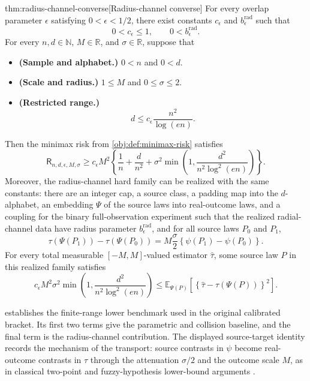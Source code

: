 \documentclass[11pt]{article}
\begin{document}
\begin{theoremv}{thm:radius-channel-converse}[Radius-channel converse]
For every overlap parameter \(\epsilon\) satisfying \(0<\epsilon<1/2\), there exist constants \(c_{\epsilon}\) and \(b_{\epsilon}^{\mathrm{rad}}\) such that
\[
0<c_{\epsilon}\le 1,
\qquad
0<b_{\epsilon}^{\mathrm{rad}}.
\]
For every \(n,d\in\mathbb N\), \(M\in\mathbb R\), and \(\sigma\in\mathbb R\), suppose that
\begin{itemize}
\item \textbf{(Sample and alphabet.)} \(0<n\) and \(0<d\).
\item \textbf{(Scale and radius.)} \(1\le M\) and \(0\le\sigma\le2\).
\item \textbf{(Restricted range.)}
\[
d\le c_{\epsilon}\frac{n^2}{\log(en)}.
\]
\end{itemize}
Then the minimax risk from \cref{obj:def:minimax-risk} satisfies
\[
\mathsf R_{n,d,\epsilon,M,\sigma}
\ge
c_{\epsilon}M^2
\left\{
\frac1n+\frac d{n^2}
+\sigma^2
\min\left(1,\frac{d^2}{n^2\log^2(en)}\right)
\right\}.
\]
Moreover, the radius-channel hard family can be realized with the same constants: there are an integer cap, a source class, a padding map into the \(d\)-alphabet, an embedding \(\Psi\) of the source laws into real-outcome laws, and a coupling for the binary full-observation experiment such that the realized radial-channel data have radius parameter \(b_{\epsilon}^{\mathrm{rad}}\), and for all source laws \(P_0\) and \(P_1\),
\[
\tau(\Psi(P_1))-\tau(\Psi(P_0))
=
M\frac{\sigma}{2}
\left\{\psi(P_1)-\psi(P_0)\right\}.
\]
For every total measurable \([-M,M]\)-valued estimator \(\widehat\tau\), some source law \(P\) in this realized family satisfies
\[
c_{\epsilon}M^2\sigma^2
\min\left(1,\frac{d^2}{n^2\log^2(en)}\right)
\le
\mathbb E_{\Psi(P)}
\left[
\left\{\widehat\tau-\tau(\Psi(P))\right\}^2
\right].
\]
\end{theoremv}

 establishes the finite-range lower benchmark used in the original calibrated bracket. Its first two terms give the parametric and collision baseline, and the final term is the radius-channel contribution. The displayed source-target identity records the mechanism of the transport: source contrasts in \(\psi\) become real-outcome contrasts in \(\tau\) through the attenuation \(\sigma/2\) and the outcome scale \(M\), as in classical two-point and fuzzy-hypothesis lower-bound arguments \citep{LeCam1986,Tsybakov2009,Cai2011,Donoho1990}.
\end{document}
